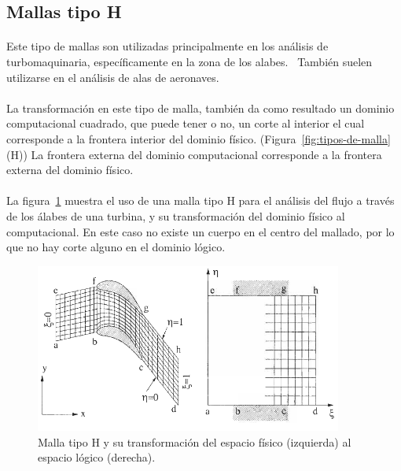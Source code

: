 \documentclass[letterpaper, openright, 12pt]{book}
\begin{document}
    \subsection{Mallas tipo H}
    \paragraph*{}
    Este tipo de mallas son utilizadas principalmente en los análisis de
    turbomaquinaria, específicamente en la zona de los
    alabes.~\cite{blazek}\cite{best-practices-grid-generation}
    También suelen utilizarse en el análisis de alas de
    aeronaves.~\cite{vladimir-grid}

    \paragraph*{}
    La transformación en este tipo de malla, también da como resultado un
    dominio computacional cuadrado, que puede tener o no, un corte al
    interior el cual corresponde a la frontera interior del dominio físico.
    (Figura~\ref{fig:tipos-de-malla} (H)) La frontera externa del dominio
    computacional corresponde a la frontera externa del dominio físico.

    \paragraph*{}
    La figura~\ref{fig:malla-h} muestra el uso de una malla tipo H para el
    análisis del flujo a través de los álabes de una turbina, y su
    transformación del dominio físico al computacional. En este caso no
    existe un cuerpo en el centro del mallado, por lo que no hay corte
    alguno en el dominio lógico.
        \begin{figure}[htbp!]
            \centering
            \includegraphics[keepaspectratio, width=0.9\textwidth]{./img/malla-h}
            \captionsetup{margin=2cm}
            \caption[Malla tipo H]{Malla tipo H y su transformación del
                espacio físico (izquierda) al espacio lógico (derecha).
                \cite{blazek}}
        \label{fig:malla-h}
        \end{figure}
\end{document}
